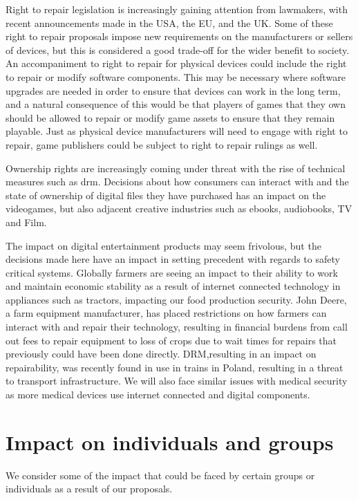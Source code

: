 Right to repair legislation is increasingly gaining attention from lawmakers, with recent announcements made in the USA\cite{us-repair-2024}, the EU\cite{eu-repair-2024}, and the UK\cite{uk-repair-2021}.
Some of these right to repair proposals impose new requirements on the manufacturers or sellers of devices, but this is considered a good trade-off for the wider benefit to society.
An accompaniment to right to repair for physical devices could include the right to repair or modify software components.
This may be necessary where software upgrades are needed in order to ensure that devices can work in the long term,
and a natural consequence of this would be that players of games that they own should be allowed to repair or modify game \glspl{asset} to ensure that they remain playable.
Just as physical device manufacturers will need to engage with right to repair, game publishers could be subject to right to repair rulings as well.

Ownership rights are increasingly coming under threat with the rise of technical measures such as \gls{drm}.
Decisions about how consumers can interact with and the state of ownership of  digital files they have purchased has an impact on the videogames,
but also adjacent creative industries such as ebooks, audiobooks, TV and Film.

The impact on digital entertainment products may seem frivolous,
but the decisions made here have an impact in setting precedent with regards to safety critical systems.
Globally farmers are seeing an impact to their ability to work and maintain economic stability as a result of internet connected technology in appliances such as tractors, impacting our food production security.
John Deere, a farm equipment manufacturer, has placed restrictions on how farmers can interact with and repair their technology,
resulting in financial burdens from call out fees to repair equipment to loss of crops due to wait times for repairs that previously could have been done directly\cite{farm-repair-2024}.
DRM,resulting in an impact on repairability, was recently found in use in trains in Poland, resulting in  a threat to transport infrastructure.
We will also face similar issues with medical security as more medical devices use internet connected and digital components\cite{internet-bodies-2019}.

\section{Impact on individuals and groups}
We consider some of the impact that could be faced by certain groups or individuals as a result of our proposals.

